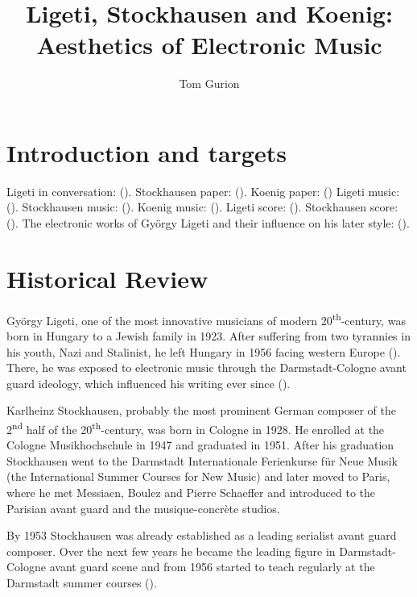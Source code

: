 \documentclass[a4paper,11pt]{article}
\title{Ligeti, Stockhausen and Koenig:\\Aesthetics of Electronic Music}
\author{Tom Gurion}
\begin{document}
\maketitle
\tableofcontents

\section{Introduction and targets}
\label{sec:introduction}

Ligeti in conversation: (\cite{varnai}).
Stockhausen paper: (\cite{stockhausen}).
Koenig paper: (\cite{koenig})
Ligeti music: (\cite{rami_music}).
Stockhausen music: (\cite{gesang_music}).
Koenig music: (\cite{todo_music}).
Ligeti score: (\cite{rami}).
Stockhausen score: (\cite{gesang}).
The electronic works of Gy{\"o}rgy Ligeti and their influence on his later style: (\cite{levy2006}).

\section{Historical Review}
\label{sec:historical_Review}

Gy{\"o}rgy Ligeti, one of the most innovative musicians of modern 20\textsuperscript{th}-century, was born in Hungary to a Jewish family in 1923.
After suffering from two tyrannies in his youth, Nazi and Stalinist, he left Hungary in 1956 facing western Europe (\cite{ligeti_grove}).
There, he was exposed to electronic music through the Darmstadt-Cologne avant guard ideology, which influenced his writing ever since (\cite[p. TODO]{levy2006}).

Karlheinz Stockhausen, probably the most prominent German composer of the 2\textsuperscript{nd} half of the 20\textsuperscript{th}-century, was born in Cologne in 1928.
He enrolled at the Cologne Musikhochschule in 1947 and graduated in 1951.
After his graduation Stockhausen went to the Darmstadt Internationale Ferienkurse f{\"u}r Neue Musik (the International Summer Courses for New Music) and later moved to Paris, where he met Messiaen, Boulez and Pierre Schaeffer and introduced to the Parisian avant guard and the musique-concr{\`e}te studios.

By 1953 Stockhausen was already established as a leading serialist avant guard composer.
Over the next few years he became the leading figure in Darmstadt-Cologne avant guard scene and from 1956 started to teach regularly at the Darmstadt summer courses (\cite{stockhausen_grove}).
\end{document}
